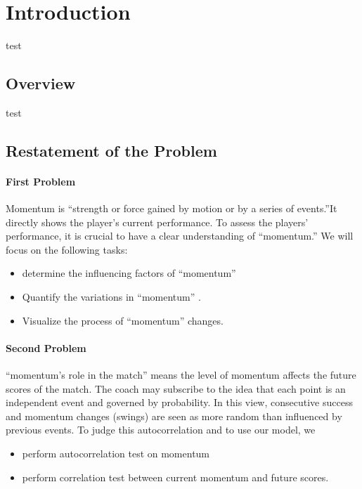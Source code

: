\setcounter{page}{1}

\section{Introduction}

test

\subsection{Overview}

test

\subsection{Restatement of the Problem}

\paragraph{First Problem}

Momentum is “strength or force gained by motion or by a series of 
events.”It directly shows the player's current performance.
To assess the players' performance, it is crucial to have a clear understanding of ``momentum.'' 
We will focus on the following tasks: 
\begin{itemize}
    \item determine the influencing factors of ``momentum''
    \item Quantify the variations in ``momentum'' .
    \item Visualize the process of ``momentum'' changes.
\end{itemize}

\paragraph{Second Problem}

``momentum's role in the match'' means the level of momentum affects the future scores of the match.
The coach may subscribe to the idea that each point is an independent event and governed by probability.
In this view, consecutive success and momentum changes (swings) are seen as more random than influenced by previous events.
To judge this autocorrelation and to use our model, we 

\begin{itemize}
    \item perform autocorrelation test on momentum
    \item perform correlation test between current momentum and future scores.
\end{itemize}




